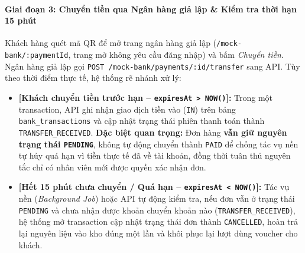 \paragraph{Giai đoạn 3: Chuyển tiền qua Ngân hàng giả lập \& Kiểm tra thời hạn 15 phút}
Khách hàng quét mã QR để mở trang ngân hàng giả lập (\texttt{/mock-bank/:paymentId}, trang mở không yêu cầu đăng nhập) và bấm \emph{Chuyển tiền}. Ngân hàng giả lập gọi \texttt{POST /mock-bank/payments/:id/transfer} sang API. Tùy theo thời điểm thực tế, hệ thống rẽ nhánh xử lý:
\begin{itemize}
  \item \textbf{[Khách chuyển tiền trước hạn -- \texttt{expiresAt > NOW()}]:}
    Trong một transaction, API ghi nhận giao dịch tiền vào (\texttt{IN}) trên bảng \texttt{bank\_transactions} và cập nhật trạng thái phiên thanh toán thành \texttt{TRANSFER\_RECEIVED}. 
    \textbf{Đặc biệt quan trọng:} Đơn hàng \textbf{vẫn giữ nguyên trạng thái \texttt{PENDING}}, không tự động chuyển thành \texttt{PAID} để chống tác vụ nền tự hủy quá hạn vì tiền thực tế đã về tài khoản, đồng thời tuân thủ nguyên tắc chỉ có nhân viên mới được quyền xác nhận đơn.
  \item \textbf{[Hết 15 phút chưa chuyển / Quá hạn -- \texttt{expiresAt < NOW()}]:}
    Tác vụ nền (\emph{Background Job}) hoặc API tự động kiểm tra, nếu đơn vẫn ở trạng thái \texttt{PENDING} và chưa nhận được khoản chuyển khoản nào (\texttt{TRANSFER\_RECEIVED}), hệ thống mở transaction cập nhật trạng thái đơn thành \texttt{CANCELLED}, hoàn trả lại nguyên liệu vào kho đúng một lần và khôi phục lại lượt dùng voucher cho khách.
\end{itemize}

